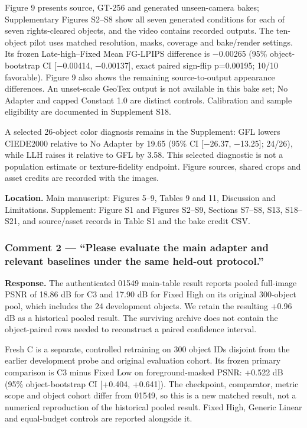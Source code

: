 \documentclass[
  10pt,
]{article}
\begin{document}
Figure 9 presents source, GT-256 and generated unseen-camera bakes; Supplementary Figures S2--S8 show all seven generated conditions for each of seven rights-cleared objects, and the video contains recorded outputs. The ten-object pilot uses matched resolution, masks, coverage and bake/render settings. Its frozen Late-high--Fixed Mean FG-LPIPS difference is −0.00265 (95\% object-bootstrap CI {[}−0.00414, −0.00137{]}, exact paired sign-flip p=0.00195; 10/10 favorable). Figure 9 also shows the remaining source-to-output appearance differences. An unset-scale GeoTex output is not available in this bake set; No Adapter and capped Constant 1.0 are distinct controls. Calibration and sample eligibility are documented in Supplement S18.

A selected 26-object color diagnosis remains in the Supplement: GFL lowers CIEDE2000 relative to No Adapter by 19.65 (95\% CI {[}−26.37, −13.25{]}; 24/26), while LLH raises it relative to GFL by 3.58. This selected diagnostic is not a population estimate or texture-fidelity endpoint. Figure sources, shared crops and asset credits are recorded with the images.

\textbf{Location.} Main manuscript: Figures 5--9, Tables 9 and 11, Discussion and Limitations. Supplement: Figure S1 and Figures S2--S9, Sections S7--S8, S13, S18--S21, and source/asset records in Table S1 and the bake credit CSV.

\hypertarget{comment-2--please-evaluate-the-main-adapter-and-relevant-baselines-under-the-same-held-out-protocol}{%
\subsubsection{Comment 2 --- ``Please evaluate the main adapter and relevant baselines under the same held-out protocol.''}\label{comment-2--please-evaluate-the-main-adapter-and-relevant-baselines-under-the-same-held-out-protocol}}

\textbf{Response.} The authenticated 01549 main-table result reports pooled full-image PSNR of 18.86 dB for C3 and 17.90 dB for Fixed High on its original 300-object pool, which includes the 24 development objects. We retain the resulting +0.96 dB as a historical pooled result. The surviving archive does not contain the object-paired rows needed to reconstruct a paired confidence interval.

Fresh C is a separate, controlled retraining on 300 object IDs disjoint from the earlier development probe and original evaluation cohort. Its frozen primary comparison is C3 minus Fixed Low on foreground-masked PSNR: +0.522 dB (95\% object-bootstrap CI {[}+0.404, +0.641{]}). The checkpoint, comparator, metric scope and object cohort differ from 01549, so this is a new matched result, not a numerical reproduction of the historical pooled result. Fixed High, Generic Linear and equal-budget controls are reported alongside it.
\end{document}
